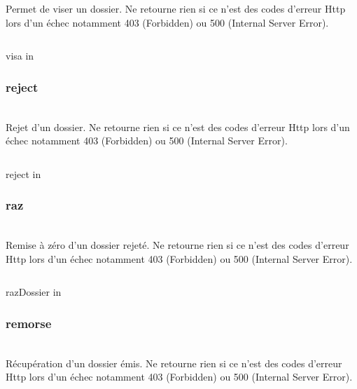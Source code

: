 Permet de viser un dossier.
Ne retourne rien si ce n'est des codes d'erreur Http lors d'un échec notamment 403 (Forbidden) ou 500 (Internal Server Error).

\begin{codesnippet}
\inputminted[frame=single,linenos,fontsize=\footnotesize]{javascript}{extraits/visa_in.js}
\caption{visa in}
\label{snip:visa_in}
\end{codesnippet}


\subsubsection{reject}
\\

Rejet d'un dossier.
Ne retourne rien si ce n'est des codes d'erreur Http lors d'un échec notamment 403 (Forbidden) ou 500 (Internal Server Error).

\begin{codesnippet}[htb]
\inputminted[frame=single,linenos,fontsize=\footnotesize]{javascript}{extraits/reject_in.js}
\caption{reject in}
\label{snip:reject_in}
\end{codesnippet}


\subsubsection{raz}
\\

Remise à zéro d'un dossier rejeté.
Ne retourne rien si ce n'est des codes d'erreur Http lors d'un échec notamment 403 (Forbidden) ou 500 (Internal Server Error).

\begin{codesnippet}
\inputminted[frame=single,linenos,fontsize=\footnotesize]{javascript}{extraits/razDossier_in.js}
\caption{razDossier in}
\label{snip:razDossier_in}
\end{codesnippet}


\subsubsection{remorse}
\\

Récupération d'un dossier émis.
Ne retourne rien si ce n'est des codes d'erreur Http lors d'un échec notamment 403 (Forbidden) ou 500 (Internal Server Error).

